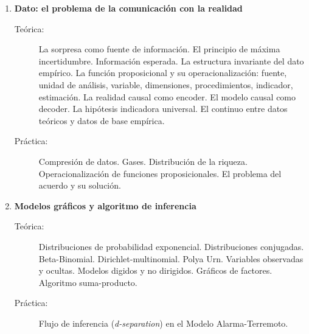\documentclass[10pt]{article}
\begin{document}
\begin{enumerate}
\vspace{0.1cm}
\item \textbf{Dato: el problema de la comunicación con la realidad}
\vspace{-0.15cm}
\begin{description}
\item[Teórica:] La sorpresa como fuente de información. El principio de máxima incertidumbre. Información esperada. La estructura invariante del dato empírico. La función proposicional y su operacionalización: fuente, unidad de análisis, variable, dimensiones, procedimientos, indicador, estimación. La realidad causal como encoder. El modelo causal como decoder. La hipótesis indicadora universal. El continuo entre datos teóricos y datos de base empírica.
\item[Práctica:] Compresión de datos. Gases. Distribución de la riqueza. Operacionalización de funciones proposicionales. El problema del acuerdo y su solución.
\end{description}





\vspace{0.1cm}
\item \textbf{Modelos gráficos y algoritmo de inferencia}
\vspace{-0.15cm}
\begin{description}
\item[Teórica:] Distribuciones de probabilidad exponencial. Distribuciones conjugadas. Beta-Binomial. Dirichlet-multinomial. Polya Urn. Variables observadas y ocultas. Modelos digidos y no dirigidos. Gráficos de factores. Algoritmo suma-producto.
\item[Práctica:] Flujo de inferencia (\emph{d-separation}) en el Modelo Alarma-Terremoto.
\end{description}


\end{enumerate}
\end{document}
